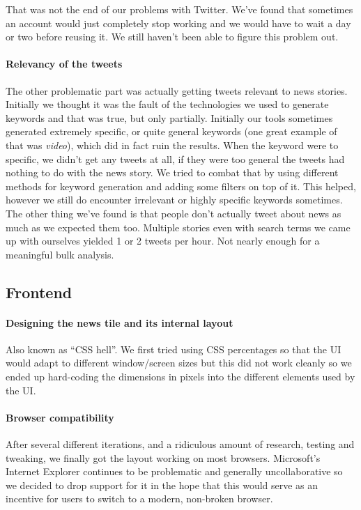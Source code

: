 \documentclass{report}
\begin{document}
	  That was not the end of our problems with Twitter. We've found that sometimes an account would just completely stop working and we would have to wait a day or two before reusing it. We still haven't been able to figure this problem out.
	  
	  \paragraph{Relevancy of the tweets} The other problematic part was actually getting tweets relevant to news stories. Initially we thought it was the fault of the technologies we used to generate keywords and that was true, but only partially. Initially our tools sometimes generated extremely specific, or quite general keywords (one great example of that was \emph{video}), which did in fact ruin the results. When the keyword were to specific, we didn't get any tweets at all, if they were too general the tweets had nothing to do with the news story. We tried to combat that by using different methods for keyword generation and adding some filters on top of it. This helped, however we still do encounter irrelevant or highly specific keywords sometimes. The other thing we've found is that people don't actually tweet about news as much as we expected them too. Multiple stories even with search terms we came up with ourselves yielded 1 or 2 tweets per hour. Not nearly enough for a meaningful bulk analysis.
	  
	  \subsection{Frontend}
	  
	  \paragraph{Designing the news tile and its internal layout}
    Also known as ``CSS hell''. We first tried using CSS percentages so that the UI would adapt to different window/screen sizes but this did not work cleanly so we ended up hard-coding the dimensions in pixels into the different elements used by the UI.


    \paragraph{Browser compatibility}
    After several different iterations, and a ridiculous amount of research, testing and tweaking, we finally got the layout working on most browsers. Microsoft's Internet Explorer continues to be problematic and generally uncollaborative so we decided to drop support for it in the hope that this would serve as an incentive for users to switch to a modern, non-broken browser.
\end{document}
